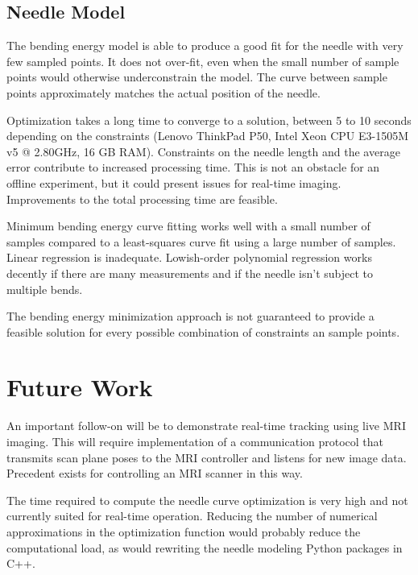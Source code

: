 \subsection{Needle Model}
The bending energy model is able to produce a good fit for the needle with very few sampled points. It does not over-fit, even when the small number of sample points would otherwise underconstrain the model. The curve between sample points approximately matches the actual position of the needle. 

Optimization takes a long time to converge to a solution, between 5 to 10 seconds depending on the constraints (Lenovo ThinkPad P50, Intel Xeon CPU E3-1505M v5 @ 2.80GHz, 16 GB RAM). Constraints on the needle length and the average error contribute to increased processing time. This is not an obstacle for an offline experiment, but it could present issues for real-time imaging. Improvements to the total processing time are feasible.

Minimum bending energy curve fitting works well with a small number of samples compared to a least-squares curve fit using a large number of samples. Linear regression is inadequate. Lowish-order polynomial regression works decently if there are many measurements and if the needle isn't subject to multiple bends.

The bending energy minimization approach is not guaranteed to provide a feasible solution for every possible combination of constraints an sample points.


\section{Future Work}
An important follow-on will be to demonstrate real-time tracking using live MRI imaging. This will require implementation of a communication protocol that transmits scan plane poses to the MRI controller and listens for new image data. Precedent exists for controlling an MRI scanner in this way\cite{patel_closed-loop_2015}.

The time required to compute the needle curve optimization is very high and not currently suited for real-time operation. Reducing the number of numerical approximations in the optimization function would probably reduce the computational load, as would rewriting the needle modeling Python packages in C++.

